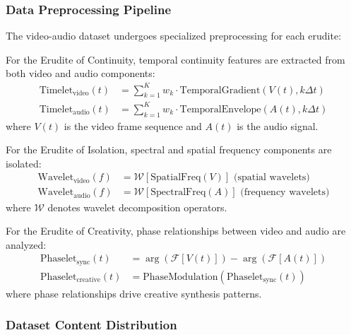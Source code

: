 \subsubsection{Data Preprocessing Pipeline}

The video-audio dataset undergoes specialized preprocessing for each erudite:

\begin{definition}
For the Erudite of Continuity, temporal continuity features are extracted from both video and audio components:
\begin{align}
\text{Timelet}_{\text{video}}(t) &= \sum_{k=1}^{K} w_k \cdot \text{TemporalGradient}(V(t), k\Delta t) \\
\text{Timelet}_{\text{audio}}(t) &= \sum_{k=1}^{K} w_k \cdot \text{TemporalEnvelope}(A(t), k\Delta t)
\end{align}
where $V(t)$ is the video frame sequence and $A(t)$ is the audio signal.
\end{definition}

\begin{definition}
For the Erudite of Isolation, spectral and spatial frequency components are isolated:
\begin{align}
\text{Wavelet}_{\text{video}}(f) &= \mathcal{W}[\text{SpatialFreq}(V)] \text{ (spatial wavelets)} \\
\text{Wavelet}_{\text{audio}}(f) &= \mathcal{W}[\text{SpectralFreq}(A)] \text{ (frequency wavelets)}
\end{align}
where $\mathcal{W}$ denotes wavelet decomposition operators.
\end{definition}

\begin{definition}
For the Erudite of Creativity, phase relationships between video and audio are analyzed:
\begin{align}
\text{Phaselet}_{\text{sync}}(t) &= \arg(\mathcal{F}[V(t)]) - \arg(\mathcal{F}[A(t)]) \\
\text{Phaselet}_{\text{creative}}(t) &= \text{PhaseModulation}(\text{Phaselet}_{\text{sync}}(t))
\end{align}
where phase relationships drive creative synthesis patterns.
\end{definition}

\subsubsection{Dataset Content Distribution}

